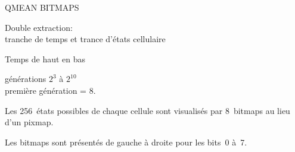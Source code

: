 {%
  {  }}%
{%
  QMEAN BITMAPS

  Double extraction:\\
  tranche de temps et trance d'\'etats cellulaire

  Temps de haut en bas

  g\'en\'erations $2^{3}$ \`a $2^{10}$\\
  premi\`ere g\'en\'eration = 8.

  Les 256~\'etats possibles de chaque cellule sont visualis\'es par
  8~bitmaps au lieu d'un pixmap.

  Les bitmaps sont pr\'esent\'es de gauche \`a droite pour les bits~0 \`a~7.}

\begin{slide}
  { }
  { }
\end{slide}


